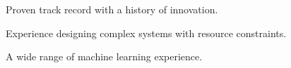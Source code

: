 

\begin{cventries}

  \cventry
    {} %
    {} %
    {} %
    {} %
    {
      \begin{cvitems} %
      \item Proven track record with a history of innovation.
      \item Experience designing complex systems with resource constraints.
      \item A wide range of machine learning experience.
      \end{cvitems}
    }


\end{cventries}
